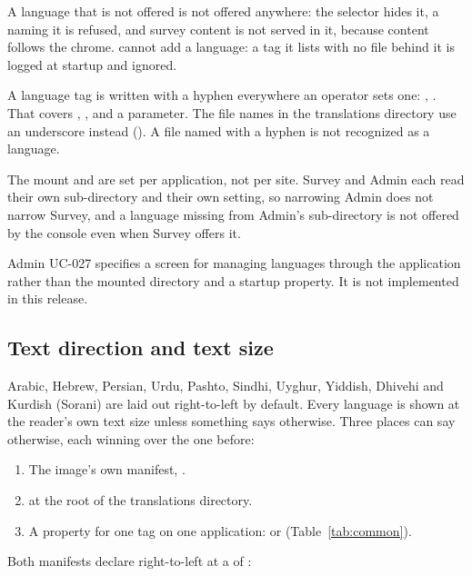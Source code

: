 \documentclass[11pt, a4paper]{article}
\begin{document}
A language that is not offered is not offered anywhere: the selector hides it, a 
naming it is refused, and survey content is not served in it, because content follows the
chrome.  cannot add a language: a tag it lists with no file behind
it is logged at startup and ignored.

\begin{elicitcaution}
A language tag is written with a hyphen everywhere an operator sets one: ,
. That covers , ,
 and a  parameter. The file names in the
translations directory use an underscore instead (). A
file named with a hyphen is not recognized as a language.
\end{elicitcaution}

The mount and  are set per application, not per site. Survey and
Admin each read their own sub-directory and their own setting, so narrowing Admin does not
narrow Survey, and a language missing from Admin's sub-directory is not offered by the console
even when Survey offers it.

\begin{elicitnote}
Admin UC-027 specifies a  screen for managing languages through the application
rather than the mounted directory and a startup property. It is not implemented in this release.
\end{elicitnote}

\subsection{Text direction and text size}
\label{sec:direction}

Arabic, Hebrew, Persian, Urdu, Pashto, Sindhi, Uyghur, Yiddish, Dhivehi and Kurdish (Sorani)
are laid out right-to-left by default. Every language is shown at the reader's own text size
unless something says otherwise. Three places can say otherwise, each winning over the one
before:
\begin{enumerate}
  \item The image's own manifest, .
  \item {} at the root of the translations directory.
  \item A property for one tag on one application:  or
         (Table~\ref{tab:common}).
\end{enumerate}
Both manifests declare  right-to-left at a  of :
\end{document}
